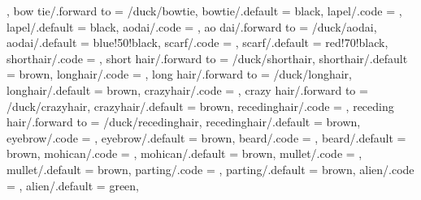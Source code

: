 {                              \def\duck@bowtie{#1},
  bow tie/.forward to       = /duck/bowtie,
  bowtie/.default           = black,     
  lapel/.code               = \duck@lapeltrue   
                              \def\duck@lapel{#1},
  lapel/.default            = black,  
  aodai/.code               = \duck@aodaitrue
                              \duck@clothingtrue
                              \def\duck@aodai{#1},
  ao dai/.forward to        = /duck/aodai,                         
  aodai/.default            = blue!50!black,
  scarf/.code               = \duck@scarftrue
                              \def\duck@scarf{#1},
  scarf/.default            = red!70!black,
  shorthair/.code           = \duck@shorthairtrue    
                              \def\duck@hair{#1},
  short hair/.forward to    = /duck/shorthair,
  shorthair/.default        = brown,
  longhair/.code            = \duck@longhairtrue     
                              \def\duck@hair{#1},
  long hair/.forward to     = /duck/longhair,
  longhair/.default         = brown,
  crazyhair/.code           = \duck@crazyhairtrue    
                              \def\duck@hair{#1},
  crazy hair/.forward to    = /duck/crazyhair,
  crazyhair/.default        = brown,
  recedinghair/.code        = \duck@recedinghairtrue 
                              \def\duck@hair{#1},
  receding hair/.forward to = /duck/recedinghair,
  recedinghair/.default     = brown,
  eyebrow/.code             = \duck@eyebrowtrue      
                              \def\duck@eyebrow{#1},
  eyebrow/.default          = brown,
  beard/.code               = \duck@beardtrue        
                              \def\duck@beard{#1},
  beard/.default            = brown,
  mohican/.code             = \duck@mohicantrue      
                              \def\duck@hair{#1},
  mohican/.default          = brown,
  mullet/.code              = \duck@mullettrue       
                              \def\duck@hair{#1},
  mullet/.default           = brown,
  parting/.code             = \duck@partingtrue      
                              \def\duck@hair{#1},
  parting/.default          = brown,
  alien/.code               = \duck@alientrue       
                              \def\duck@alien{#1},
  alien/.default            = green, 
}
